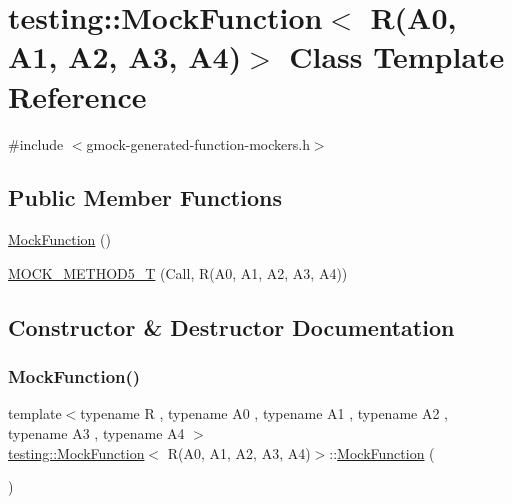 \hypertarget{classtesting_1_1MockFunction_3_01R_07A0_00_01A1_00_01A2_00_01A3_00_01A4_08_4}{}\section{testing\+::Mock\+Function$<$ R(A0, A1, A2, A3, A4)$>$ Class Template Reference}
\label{classtesting_1_1MockFunction_3_01R_07A0_00_01A1_00_01A2_00_01A3_00_01A4_08_4}


{\ttfamily \#include $<$gmock-\/generated-\/function-\/mockers.\+h$>$}

\subsection*{Public Member Functions}
\begin{DoxyCompactItemize}
\item 
\mbox{\hyperlink{classtesting_1_1MockFunction_3_01R_07A0_00_01A1_00_01A2_00_01A3_00_01A4_08_4_a8f54e305eb5e5cf5f7da836937e159ef}{Mock\+Function}} ()
\item 
\mbox{\hyperlink{classtesting_1_1MockFunction_3_01R_07A0_00_01A1_00_01A2_00_01A3_00_01A4_08_4_a572318905fea75f71338c120f7d1833d}{M\+O\+C\+K\+\_\+\+M\+E\+T\+H\+O\+D5\+\_\+T}} (Call, R(A0, A1, A2, A3, A4))
\end{DoxyCompactItemize}


\subsection{Constructor \& Destructor Documentation}
\mbox{\label{classtesting_1_1MockFunction_3_01R_07A0_00_01A1_00_01A2_00_01A3_00_01A4_08_4_a8f54e305eb5e5cf5f7da836937e159ef}} 
\subsubsection{\texorpdfstring{MockFunction()}{MockFunction()}}
{\footnotesize\ttfamily template$<$typename R , typename A0 , typename A1 , typename A2 , typename A3 , typename A4 $>$ \\
\mbox{\hyperlink{classtesting_1_1MockFunction}{testing\+::\+Mock\+Function}}$<$ R(A0, A1, A2, A3, A4)$>$\+::\mbox{\hyperlink{classtesting_1_1MockFunction}{Mock\+Function}} (\begin{DoxyParamCaption}{ }\end{DoxyParamCaption})\hspace{0.3cm}{\ttfamily [inline]}}



